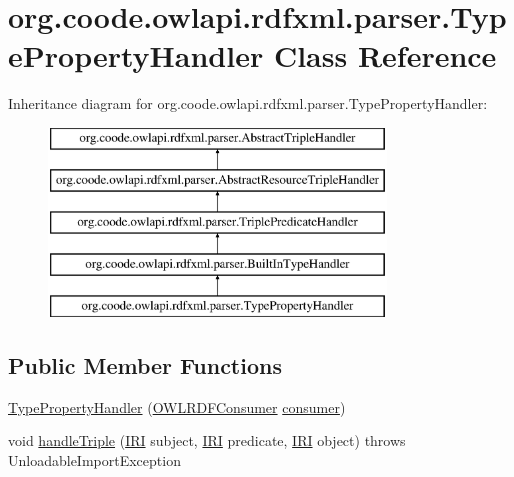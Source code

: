 \hypertarget{classorg_1_1coode_1_1owlapi_1_1rdfxml_1_1parser_1_1_type_property_handler}{\section{org.\-coode.\-owlapi.\-rdfxml.\-parser.\-Type\-Property\-Handler Class Reference}
\label{classorg_1_1coode_1_1owlapi_1_1rdfxml_1_1parser_1_1_type_property_handler}
}
Inheritance diagram for org.\-coode.\-owlapi.\-rdfxml.\-parser.\-Type\-Property\-Handler\-:\begin{figure}[H]
\begin{center}
\leavevmode
\includegraphics[height=5.000000cm]{classorg_1_1coode_1_1owlapi_1_1rdfxml_1_1parser_1_1_type_property_handler}
\end{center}
\end{figure}
\subsection*{Public Member Functions}
\begin{DoxyCompactItemize}
\item 
\hyperlink{classorg_1_1coode_1_1owlapi_1_1rdfxml_1_1parser_1_1_type_property_handler_a70f7ed06f148f53672147eb640190bff}{Type\-Property\-Handler} (\hyperlink{classorg_1_1coode_1_1owlapi_1_1rdfxml_1_1parser_1_1_o_w_l_r_d_f_consumer}{O\-W\-L\-R\-D\-F\-Consumer} \hyperlink{classorg_1_1coode_1_1owlapi_1_1rdfxml_1_1parser_1_1_abstract_triple_handler_a4ccf4d898ff01eb1cadfa04b23d54e9c}{consumer})
\item 
void \hyperlink{classorg_1_1coode_1_1owlapi_1_1rdfxml_1_1parser_1_1_type_property_handler_adbc869c0f84c7fe97dbf6d64919e3eb4}{handle\-Triple} (\hyperlink{classorg_1_1semanticweb_1_1owlapi_1_1model_1_1_i_r_i}{I\-R\-I} subject, \hyperlink{classorg_1_1semanticweb_1_1owlapi_1_1model_1_1_i_r_i}{I\-R\-I} predicate, \hyperlink{classorg_1_1semanticweb_1_1owlapi_1_1model_1_1_i_r_i}{I\-R\-I} object)  throws Unloadable\-Import\-Exception 
\end{DoxyCompactItemize}
